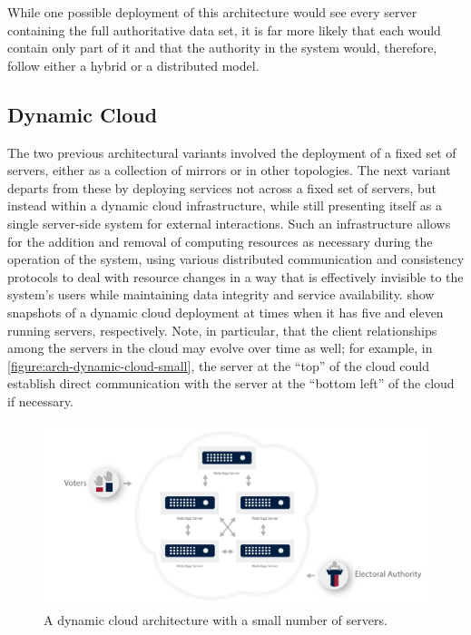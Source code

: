 While one possible deployment of this architecture would see every
server containing the full authoritative data set, it is far more
likely that each would contain only part of it and that the authority
in the system would, therefore, follow either a hybrid or a distributed
model. 

\subsection{Dynamic Cloud}

The two previous architectural variants involved the deployment of a
fixed set of servers, either as a collection of mirrors or in other
topologies. The next variant departs from these by deploying services
not across a fixed set of servers, but instead within a dynamic cloud
infrastructure, while still presenting itself as a single server-side
system for external interactions. Such an infrastructure allows for
the addition and removal of computing resources as necessary during
the operation of the system, using various distributed communication
and consistency protocols to deal with resource changes in a way that
is effectively invisible to the system's users while maintaining data
integrity and service
availability.  show snapshots of a dynamic cloud
deployment at times when it has five and eleven running servers,
respectively. Note, in particular, that the client relationships among
the servers in the cloud may evolve over time as well; for example, in
\autoref{figure:arch-dynamic-cloud-small}, the server at the ``top''
of the cloud could establish direct communication with the server at
the ``bottom left'' of the cloud if necessary.

\begin{figure}[p]
\begin{center}
\includegraphics[width=6.5in]{architecture_resources/dynamic-cloud-small.pdf}
\end{center}
\caption{A dynamic cloud architecture with a small number of servers.}
\label{figure:arch-dynamic-cloud-small}
\end{figure}

